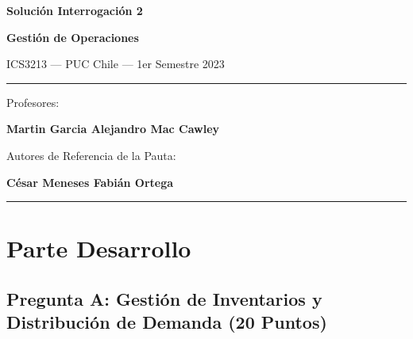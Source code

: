 \documentclass[11pt, a4paper]{article}
\begin{document}
\begin{titlepage}
  \centering
  \vspace*{2cm}
  {\Huge\bfseries\color{gopcyan} Solución Interrogación 2\par}
  \vspace{0.4cm}
  {\LARGE\bfseries Gestión de Operaciones\par}
  \vspace{0.3cm}
  {\large ICS3213 --- PUC Chile --- 1er Semestre 2023\par}
  \vspace{1.2cm}
  \rule{\textwidth}{0.4pt}
  \vspace{0.4cm}

  {\small Profesores:\par}
  {\large\bfseries Martin Garcia \quad Alejandro Mac Cawley\par}
  \vspace{0.3cm}
  {\small Autores de Referencia de la Pauta:\par}
  {\small\textbf{César Meneses \quad Fabián Ortega}\par}
  \vspace{0.4cm}
  \rule{\textwidth}{0.4pt}
  \vspace{1cm}

  \vfill
\end{titlepage}

\newpage

\section{Parte Desarrollo}

\subsection*{Pregunta A: Gestión de Inventarios y Distribución de Demanda (20 Puntos)}
\end{document}
